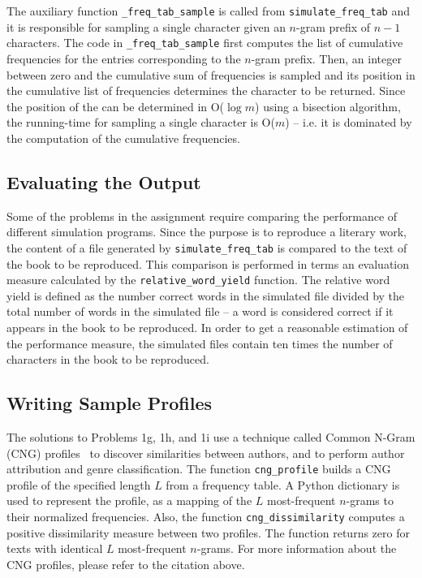 \documentclass[conference]{IEEEtran}
\newcommand{\codeinline}[1]{{\fontsize{8}{0}\selectfont\texttt{#1}}}
\begin{document}
The auxiliary function \codeinline{\_freq\_tab\_sample} is called from \codeinline{simulate\_freq\_tab} and it is responsible for sampling a single character given an \mbox{$n$-gram} prefix of $n-1$ characters.
The code in \codeinline{\_freq\_tab\_sample} first computes the list of cumulative frequencies for the entries corresponding to the \mbox{$n$-gram} prefix.
Then, an integer between zero and the cumulative sum of frequencies is sampled and its position in the cumulative list of frequencies determines the character to be returned.
Since the position of the can be determined in O($\log m$) using a bisection algorithm, the running-time for sampling a single character is O($m$) 
-- i.e. it is dominated by the computation of the cumulative frequencies.


\subsection{Evaluating the Output}

Some of the problems in the assignment require comparing the performance of different simulation programs.
Since the purpose is to reproduce a literary work, the content of a file generated by \codeinline{simulate\_freq\_tab} is compared to the text of the book to be reproduced.
This comparison is performed in terms an evaluation measure calculated by the \codeinline{relative\_word\_yield} function.
The relative word yield is defined as the number correct words in the simulated file divided by the total number of words in the simulated file
-- a word is considered correct if it appears in the book to be reproduced.
In order to get a reasonable estimation of the performance measure, the simulated files contain ten times the number of characters in the book to be reproduced.


\subsection{Writing Sample Profiles}

The solutions to Problems 1g, 1h, and 1i use a technique called Common N-Gram (CNG) profiles~\cite{Keselj2003} to discover similarities between authors, and to perform author attribution and genre classification.
The function \codeinline{cng\_profile} builds a CNG profile of the specified length $L$ from a frequency table.
A Python dictionary is used to represent the profile, as a mapping of the $L$ most-frequent \mbox{\mbox{$n$-gram}s} to their normalized frequencies.
Also, the function \codeinline{cng\_dissimilarity} computes a positive dissimilarity measure between two profiles.
The function returns zero for texts with identical $L$ most-frequent \mbox{\mbox{$n$-gram}s}.
For more information about the CNG profiles, please refer to the citation above.
\end{document}
